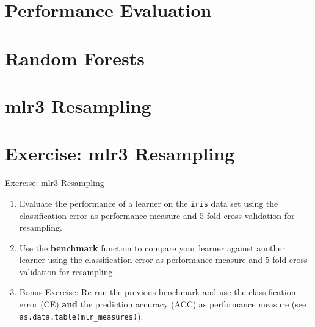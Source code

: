 \documentclass[11pt,compress]{beamer}
\begin{document}


\section{Performance Evaluation} %

%
%





\section{Random Forests} %






\section{mlr3 Resampling} %


\section{Exercise: mlr3 Resampling} %
\begin{frame}{Exercise: mlr3 Resampling}
\begin{enumerate}
\item Evaluate the performance of a learner on the \texttt{iris} data set using the classification error as performance measure and 5-fold cross-validation for resampling.
\item Use the \textbf{benchmark} function to compare your learner against another learner using the classification error as performance measure and 5-fold cross-validation for resampling.
\item Bonus Exercise: Re-run the previous benchmark and use the classification error (CE) \textbf{and} the prediction accuracy (ACC) as performance measure (see \texttt{as.data.table(mlr\_measures)}).
\end{enumerate}
\end{frame}
\end{document}
